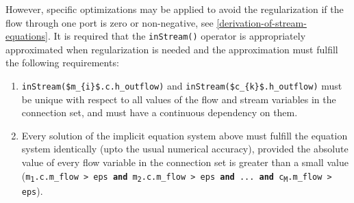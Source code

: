 However, specific optimizations may be applied to avoid the regularization if the
flow through one port is zero or non-negative, see \autoref{derivation-of-stream-equations}. It is
required that the \lstinline!inStream()! operator is appropriately
approximated when regularization is needed and the approximation must
fulfill the following requirements:
\begin{enumerate}
\item
  \lstinline!inStream($m_{i}$.c.h_outflow)! and
  \lstinline!inStream($c_{k}$.h_outflow)! must be unique with
  respect to all values of the flow and stream variables in the
  connection set, and must have a continuous dependency on them.
\item
  Every solution of the implicit equation system above must fulfill the
  equation system identically (upto the usual numerical
  accuracy), provided the absolute value of every flow variable in
  the connection set is greater than a small value
  (\texttt{\textbar{}m\textsubscript{1}.c.m\_flow\textbar{} \textgreater{} eps
  \textbf{and} \textbar{}m\textsubscript{2}.c.m\_flow\textbar{}
  \textgreater{} eps \textbf{and} ... \textbf{and}
  \textbar{}c\textsubscript{M}.m\_flow\textbar{} \textgreater{} eps}).
\end{enumerate}

